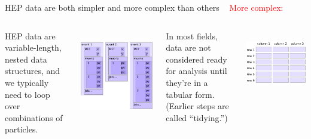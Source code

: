 \documentclass[aspectratio=169]{beamer}
\begin{document}
\begin{frame}{HEP data are both simpler and more complex than others}
\vspace{0.35 cm}
\mbox{ } \hfill \textcolor{red}{\LARGE More complex:} \hfill \mbox{ }

\vspace{-0.25 cm}
\begin{columns}[t]

HEP data are variable-length, nested data structures, and we typically need to loop over combinations of particles.

\vspace{0.25 cm}
\mbox{ } \hfill \includegraphics[width=0.8\linewidth]{event-structure.pdf} \hfill \hfill \mbox{ }


In most fields, data are not considered ready for analysis until they're in a tabular form. (Earlier steps are called ``tidying.'')

\vspace{0.25 cm}
\mbox{ } \hfill \includegraphics[width=0.8\linewidth]{table-structure.pdf} \hfill \hfill \mbox{ }

\end{columns}
\end{frame}
\end{document}
